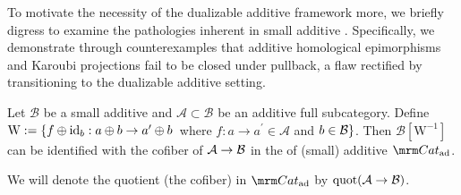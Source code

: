 \documentclass[a4paper,10pt, oneside]{amsart}
\begin{document}
To  motivate the necessity of the dualizable additive framework more, we briefly digress to examine the pathologies inherent in small additive \infcats. Specifically, we demonstrate through counterexamples that additive homological epimorphisms and Karoubi projections fail to be closed under pullback, a flaw  rectified by transitioning to the dualizable additive setting.

\begin{thm}\label{addquot}
	Let $\mathcal{B}$ be a small additive \infcat and $\mathcal{A} \subset \mathcal{B}$ be an additive full subcategory. 
	Define
	$\mathrm{W}:=\left\{f \oplus \mathrm{id}_b: a \oplus b \rightarrow a^{\prime} \oplus b\right.$ where $f: a \rightarrow a^{\prime} \in \mathcal{A}$ and $b\in\mathcal{B}\}$. Then $\mathcal{B}[\mathrm{W}^{-1}]$ can be identified with the cofiber of $\mathcal{A}\to\mathcal{B}$ in the \infcat of (small) additive \infcats $\Cat_{\op{ad}}$.
\end{thm}
\begin{nota}
	We will denote the quotient (the cofiber) in $\Cat_{\op{ad}}$ by $\mathrm{quot}(\mathcal{A} \to \mathcal{B})$.
\end{nota}
\end{document}
